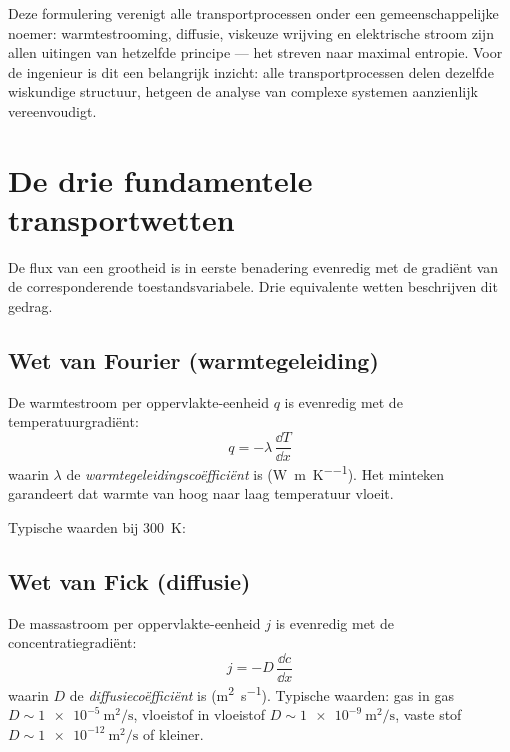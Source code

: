 Deze formulering verenigt alle transportprocessen onder een gemeenschappelijke noemer: warmtestrooming, diffusie, viskeuze wrijving en elektrische stroom zijn allen uitingen van hetzelfde principe --- het streven naar maximal entropie. Voor de ingenieur is dit een belangrijk inzicht: alle transportprocessen delen dezelfde wiskundige structuur, hetgeen de analyse van complexe systemen aanzienlijk vereenvoudigt.

\section{De drie fundamentele transportwetten}

De flux van een grootheid is in eerste benadering evenredig met de gradi\"ent van de corresponderende toestandsvariabele. Drie equivalente wetten beschrijven dit gedrag.

\subsection{Wet van Fourier (warmtegeleiding)}

De warmtestroom per oppervlakte-eenheid $q$ is evenredig met de temperatuurgradi\"ent:
\begin{equation}
\boxed{\;q = -\lambda\,\frac{\dd{T}}{\dd{x}}\;}
\end{equation}
waarin $\lambda$ de \emph{warmtegeleidingsco\"effici\"ent} is (\si{\watt\per\metre\per\kelvin}). Het minteken garandeert dat warmte van hoog naar laag temperatuur vloeit.

Typische waarden bij \SI{300}{\kelvin}:

\subsection{Wet van Fick (diffusie)}

De massastroom per oppervlakte-eenheid $j$ is evenredig met de concentratiegradi\"ent:
\begin{equation}
\boxed{\;j = -D\,\frac{\dd{c}}{\dd{x}}\;}
\end{equation}
waarin $D$ de \emph{diffusieco\"effici\"ent} is (\si{\metre\squared\per\second}). Typische waarden: gas in gas $D \sim \SI{1e-5}{\metre\squared\per\second}$, vloeistof in vloeistof $D \sim \SI{1e-9}{\metre\squared\per\second}$, vaste stof $D \sim \SI{1e-12}{\metre\squared\per\second}$ of kleiner.

